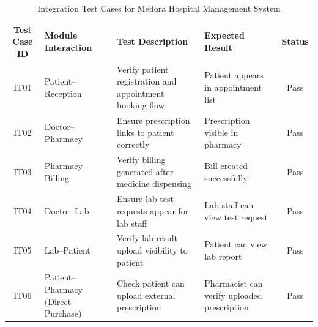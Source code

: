 \begin{table}[H]
\centering
\renewcommand{\arraystretch}{1.3}
\small
\begin{tabular}{|c|p{3cm}|p{3cm}|p{3cm}|c|}
\hline
\textbf{Test Case ID} & \textbf{Module Interaction} & \textbf{Test Description} & \textbf{Expected Result} & \textbf{Status} \\
\hline
IT01 & Patient–Reception & Verify patient registration and appointment booking flow & Patient appears in appointment list & Pass \\
\hline
IT02 & Doctor–Pharmacy & Ensure prescription links to patient correctly & Prescription visible in pharmacy & Pass \\
\hline
IT03 & Pharmacy–Billing & Verify billing generated after medicine dispensing & Bill created successfully & Pass \\
\hline
IT04 & Doctor–Lab & Ensure lab test requests appear for lab staff & Lab staff can view test request & Pass \\
\hline
IT05 & Lab–Patient & Verify lab result upload visibility to patient & Patient can view lab report & Pass \\
\hline
IT06 & Patient–Pharmacy (Direct Purchase) & Check patient can upload external prescription & Pharmacist can verify uploaded prescription & Pass \\
\hline
\end{tabular}
\caption{Integration Test Cases for Medora Hospital Management System}
\label{tab:integration_tests}
\end{table}
